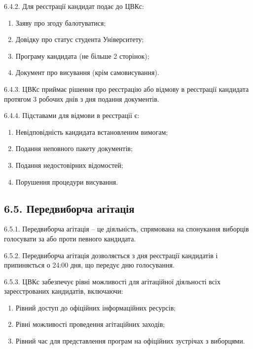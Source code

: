    6.4.2. Для реєстрації кандидат подає до ЦВКс:

        \begin{enumerate}[label=\alph*)]
            \item Заяву про згоду балотуватися;
            \item Довідку про статус студента Університету;
            \item Програму кандидата (не більше 2 сторінок);
            \item Документ про висування (крім самовисування).
        \end{enumerate}

    6.4.3. ЦВКс приймає рішення про реєстрацію або відмову в реєстрації кандидата протягом 3 робочих днів з дня подання документів.

    6.4.4. Підставами для відмови в реєстрації є:

        \begin{enumerate}[label=\alph*)]
            \item Невідповідність кандидата встановленим вимогам;
            \item Подання неповного пакету документів;
            \item Подання недостовірних відомостей;
            \item Порушення процедури висування.
        \end{enumerate}

\subsection*{6.5. Передвиборча агітація}
    6.5.1. Передвиборча агітація -- це діяльність, спрямована на спонукання виборців голосувати за або проти певного кандидата.

    6.5.2. Передвиборча агітація дозволяється з дня реєстрації кандидатів і припиняється о 24:00 дня, що передує дню голосування.

    6.5.3. ЦВКс забезпечує рівні можливості для агітаційної діяльності всіх зареєстрованих кандидатів, включаючи:

        \begin{enumerate}[label=\alph*)]
            \item Рівний доступ до офіційних інформаційних ресурсів;
            \item Рівні можливості проведення агітаційних заходів;
            \item Рівний час для представлення програм на офіційних зустрічах з виборцями.
        \end{enumerate}

